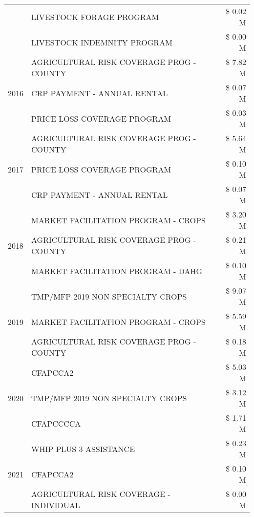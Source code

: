 \begin{tabular}{llr}
 & LIVESTOCK FORAGE PROGRAM & \$ 0.02 M \\
 & LIVESTOCK INDEMNITY PROGRAM & \$ 0.00 M \\
\cline{1-3}
\multirow[t]{3}{*}{2016} & AGRICULTURAL RISK COVERAGE PROG - COUNTY      & \$ 7.82 M \\
 & CRP PAYMENT - ANNUAL RENTAL                   & \$ 0.07 M \\
 & PRICE LOSS COVERAGE PROGRAM                   & \$ 0.03 M \\
\cline{1-3}
\multirow[t]{3}{*}{2017} & AGRICULTURAL RISK COVERAGE PROG - COUNTY & \$ 5.64 M \\
 & PRICE LOSS COVERAGE PROGRAM & \$ 0.10 M \\
 & CRP PAYMENT - ANNUAL RENTAL & \$ 0.07 M \\
\cline{1-3}
\multirow[t]{3}{*}{2018} & MARKET FACILITATION PROGRAM - CROPS & \$ 3.20 M \\
 & AGRICULTURAL RISK COVERAGE PROG - COUNTY & \$ 0.21 M \\
 & MARKET FACILITATION PROGRAM - DAHG & \$ 0.10 M \\
\cline{1-3}
\multirow[t]{3}{*}{2019} & TMP/MFP 2019 NON SPECIALTY CROPS & \$ 9.07 M \\
 & MARKET FACILITATION PROGRAM - CROPS & \$ 5.59 M \\
 & AGRICULTURAL RISK COVERAGE PROG - COUNTY & \$ 0.18 M \\
\cline{1-3}
\multirow[t]{3}{*}{2020} & CFAPCCA2 & \$ 5.03 M \\
 & TMP/MFP 2019 NON SPECIALTY CROPS & \$ 3.12 M \\
 & CFAPCCCCA & \$ 1.71 M \\
\cline{1-3}
\multirow[t]{3}{*}{2021} & WHIP PLUS 3 ASSISTANCE & \$ 0.23 M \\
 & CFAPCCA2 & \$ 0.10 M \\
 & AGRICULTURAL RISK COVERAGE - INDIVIDUAL & \$ 0.00 M \\
\cline{1-3}
\bottomrule
\end{tabular}
